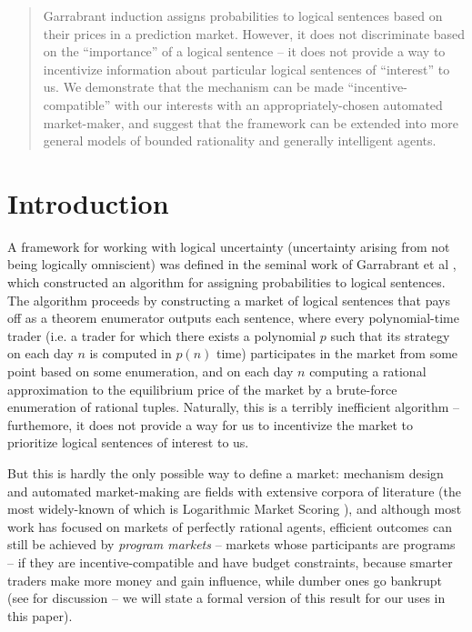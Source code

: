 \documentclass{article}
\begin{document}
\maketitle

\begin{abstract}
    Garrabrant induction assigns probabilities to logical sentences based on their prices in a prediction market. However, it does not discriminate based on the ``importance'' of a logical sentence -- it does not provide a way to incentivize information about particular logical sentences of ``interest'' to us. We demonstrate that the mechanism can be made ``incentive-compatible'' with our interests with an appropriately-chosen automated market-maker, and suggest that the framework can be extended into more general models of bounded rationality and generally intelligent agents.
\end{abstract}

\section{Introduction}

A framework for working with logical uncertainty (uncertainty arising from not being logically omniscient) was defined in the seminal work of Garrabrant et al \cite{garrabrant_logical_2016}, which constructed an algorithm for assigning probabilities to logical sentences. The algorithm proceeds by constructing a market of logical sentences that pays off as a theorem enumerator outputs each sentence, where every polynomial-time trader (i.e. a trader for which there exists a polynomial $p$ such that its strategy on each day $n$ is computed in $p(n)$ time) participates in the market from some point based on some enumeration, and on each day $n$ computing a rational approximation to the equilibrium price of the market by a brute-force enumeration of rational tuples. Naturally, this is a terribly inefficient algorithm -- furthemore, it does not provide a way for us to incentivize the market to prioritize logical sentences of interest to us.

But this is hardly the only possible way to define a market: mechanism design and automated market-making are fields with extensive corpora of literature (the most widely-known of which is Logarithmic Market Scoring \cite{hanson_logarithmic_2012}), and although most work has focused on markets of perfectly rational agents, efficient outcomes can still be achieved by \emph{program markets} -- markets whose participants are programs -- if they are incentive-compatible and have budget constraints, because smarter traders make more money and gain influence, while dumber ones go bankrupt (see \cite{gode_allocative_1993, gode_what_1997, schwartz_how_2008, jamal_simple_2015} for discussion -- we will state a formal version of this result for our uses in this paper). 
\end{document}
